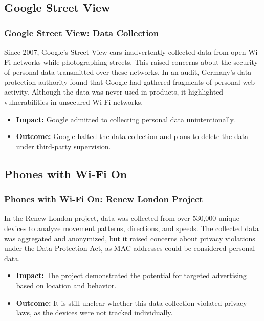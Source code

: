 \documentclass[
	11pt, %
]{beamer}
\begin{document}
\begin{frame}
  \section{Google Street View}
  \frametitle{Google Street View: Data Collection}
  Since 2007, Google's Street View cars inadvertently collected data from open Wi-Fi networks while photographing streets. This raised concerns about the security of personal data transmitted over these networks. In an audit, Germany's data protection authority found that Google had gathered fragments of personal web activity. Although the data was never used in products, it highlighted vulnerabilities in unsecured Wi-Fi networks.
  \begin{itemize}
    \item \textbf{Impact:} Google admitted to collecting personal data unintentionally. \pause
    \item \textbf{Outcome:} Google halted the data collection and plans to delete the data under third-party supervision. 
  \end{itemize}
\end{frame}

\begin{frame}
  \section{Phones with Wi-Fi On}
  \frametitle{Phones with Wi-Fi On: Renew London Project}
  In the Renew London project, data was collected from over 530,000 unique devices to analyze movement patterns, directions, and speeds. The collected data was aggregated and anonymized, but it raised concerns about privacy violations under the Data Protection Act, as MAC addresses could be considered personal data.
  \begin{itemize}
    \item \textbf{Impact:} The project demonstrated the potential for targeted advertising based on location and behavior. \pause
    \item \textbf{Outcome:} It is still unclear whether this data collection violated privacy laws, as the devices were not tracked individually. 
  \end{itemize}
\end{frame}
\end{document}
